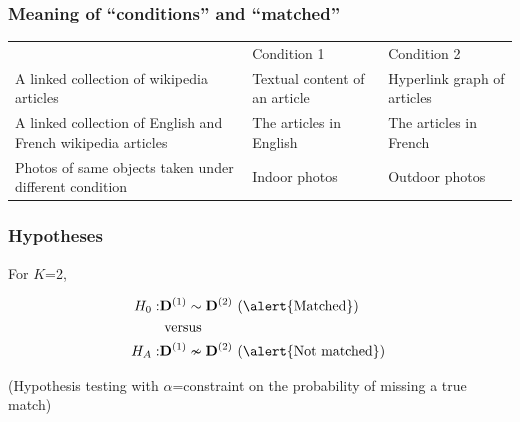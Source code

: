 \documentclass{beamer}
\newcommand\Fontvi{\fontsize{9}{10}\selectfont}
\newenvironment{changemargin}[2]{%
  \begin{list}{}{%
    \setlength{\topsep}{0pt}%
    \setlength{\leftmargin}{#1}%
    \setlength{\rightmargin}{#2}%
    \setlength{\listparindent}{\parindent}%
    \setlength{\itemindent}{\parindent}%
    \setlength{\parsep}{\parskip}%
  }%
  \item[]}{\end{list}}
\begin{document}
\begin{frame}
\Fontvi
\begin{changemargin}{-5.7cm}{-2cm}
 \frametitle{Meaning of ``conditions'' and ``matched''}
\begin{table}
\centering
\begin{tabular*}{0.75\textwidth}{ | p{3.5cm} | p{3.25cm} | p{3.7cm} | }
   &Condition 1 &Condition 2\\
\cline{1-3} \cline{1-3}
A linked collection of wikipedia articles      &Textual content of an article      &Hyperlink graph of articles\\
\cline{1-3}
A linked collection of English and French wikipedia articles  &The articles in English     &The articles in French\\
\cline{1-3}
Photos of same objects taken under different condition   &Indoor photos           &Outdoor photos\\
\cline{1-3}

\end{tabular*}
\end{table}
\end{changemargin}
\end{frame}


\begin{frame}
  \frametitle{Hypotheses}
  \vspace*{\fill}
For $K$=2, 
  
  \begin{align*}
    H_0:  &\mathbf{D}^{(1)}  \sim \mathbf{D}^{(2)} \text{ (\alert{Matched}) } \\ &\text{ versus }\\
 H_A:  &\mathbf{D}^{(1)} \nsim \mathbf{D}^{(2)} \text{ (\alert{Not matched}) } 
\end{align*}
    \begin{center}	
      \hspace{-2em} (Hypothesis testing with $\alpha$=constraint on the probability of missing a true match)
    \end{center}
       
  \vspace*{\fill}
\end{frame}
\end{document}

